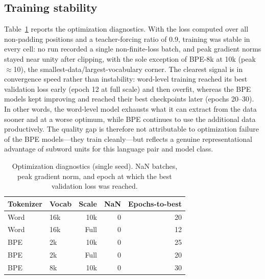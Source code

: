 \documentclass[conference]{IEEEtran}
\begin{document}
\subsection{Training stability}
Table~\ref{tab:std} reports the optimization diagnostics. With the loss computed
over all non-padding positions and a teacher-forcing ratio of 0.9, training was
stable in every cell: no run recorded a single non-finite-loss batch, and peak
gradient norms stayed near unity after clipping, with the sole exception of
BPE-8k at 10k (peak $\approx$10), the smallest-data/largest-vocabulary corner.
The clearest signal is in convergence speed rather than instability: word-level
training reached its best validation loss early (epoch 12 at full scale) and then
overfit, whereas the BPE models kept improving and reached their best checkpoints
later (epochs 20--30). In other words, the word-level model exhausts what it can
extract from the data sooner and at a worse optimum, while BPE continues to use
the additional data productively. The quality gap is therefore not attributable
to optimization failure of the BPE models---they train cleanly---but reflects a
genuine representational advantage of subword units for this language pair and
model class.

\begin{table}[t]
\caption{Optimization diagnostics (single seed). NaN batches, peak gradient norm,
and epoch at which the best validation loss was reached.}
\label{tab:std}
\centering
\begin{tabular}{l l rrr}
\toprule
Tokenizer & Vocab & Scale & NaN & Epochs-to-best \\
\midrule
Word & 16k & 10k  & 0 & 20 \\
Word & 16k & Full & 0 & 12 \\
BPE  & 2k  & 10k  & 0 & 25 \\
BPE  & 2k  & Full & 0 & 20 \\
BPE  & 8k  & 10k  & 0 & 30 \\
\bottomrule
\end{tabular}
\end{table}
\end{document}
